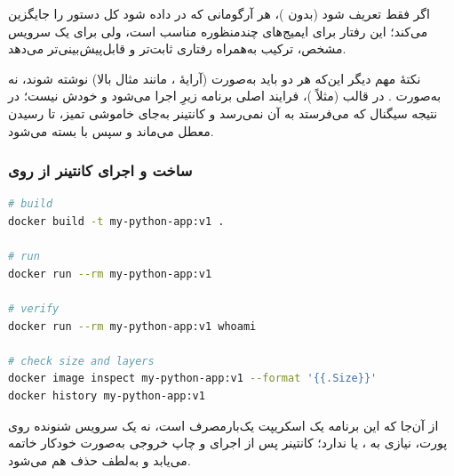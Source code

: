 اگر فقط  تعریف شود (بدون )، هر آرگومانی که در  داده شود کل دستور را جایگزین می‌کند؛ این رفتار برای ایمیج‌های چندمنظوره مناسب است، ولی برای یک سرویس مشخص، ترکیب  به‌همراه  رفتاری ثابت‌تر و قابل‌پیش‌بینی‌تر می‌دهد.

نکتهٔ مهم دیگر این‌که هر دو باید به‌صورت  (آرایهٔ ، مانند مثال بالا) نوشته شوند، نه به‌صورت . در قالب  (مثلاً )، فرایند اصلی برنامه زیرِ  اجرا می‌شود و خودش  نیست؛ در نتیجه سیگنال  که  می‌فرستد به آن نمی‌رسد و کانتینر به‌جای خاموشی تمیز، تا رسیدن  معطل می‌ماند و سپس با  بسته می‌شود.

\subsubsection*{ساخت و اجرای کانتینر از روی }

\begin{latin}
\begin{lstlisting}[language=bash]
# build
docker build -t my-python-app:v1 .

# run
docker run --rm my-python-app:v1

# verify
docker run --rm my-python-app:v1 whoami

# check size and layers
docker image inspect my-python-app:v1 --format '{{.Size}}'
docker history my-python-app:v1
\end{lstlisting}
\end{latin}

از آن‌جا که این برنامه یک اسکریپت یک‌بارمصرف است، نه یک سرویس شنونده روی پورت، نیازی به ،  یا  ندارد؛ کانتینر پس از اجرای  و چاپ خروجی به‌صورت خودکار خاتمه می‌یابد و به‌لطف  حذف هم می‌شود.